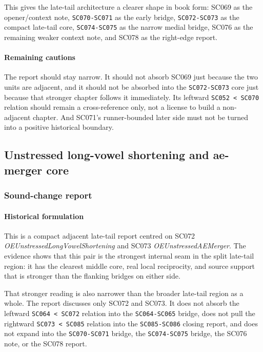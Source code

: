 \documentclass[
  british,
  a4paper,
]{article}
\begin{document}
This gives the late-tail architecture a clearer shape in book form:
SC069 as the opener/context note, \texttt{SC070-SC071} as the early
bridge, \texttt{SC072-SC073} as the compact late-tail core,
\texttt{SC074-SC075} as the narrow medial bridge, SC076 as the remaining
weaker context note, and SC078 as the right-edge report.

\paragraph{Remaining cautions}\label{remaining-cautions-44}

The report should stay narrow. It should not absorb SC069 just because
the two units are adjacent, and it should not be absorbed into the
\texttt{SC072-SC073} core just because that stronger chapter follows it
immediately. Its leftward \texttt{SC052\ \textless{}\ SC070} relation
should remain a cross-reference only, not a license to build a
non-adjacent chapter. And SC071's runner-bounded later side must not be
turned into a positive historical boundary.

\subsection{Unstressed long-vowel shortening and ae-merger
core}\label{unstressed-long-vowel-shortening-and-ae-merger-core}

\subsubsection{Sound-change report}\label{sound-change-report-45}

\paragraph{Historical formulation}\label{historical-formulation-45}

This is a compact adjacent late-tail report centred on SC072
\emph{OEUnstressedLongVowelShortening} and SC073
\emph{OEUnstressedAEMerger}. The evidence shows that this pair is the
strongest internal seam in the split late-tail region: it has the
clearest middle core, real local reciprocity, and source support that is
stronger than the flanking bridges on either side.

That stronger reading is also narrower than the broader late-tail region
as a whole. The report discusses only SC072 and SC073. It does not
absorb the leftward \texttt{SC064\ \textless{}\ SC072} relation into the
\texttt{SC064-SC065} bridge, does not pull the rightward
\texttt{SC073\ \textless{}\ SC085} relation into the
\texttt{SC085-SC086} closing report, and does not expand into the
\texttt{SC070-SC071} bridge, the \texttt{SC074-SC075} bridge, the SC076
note, or the SC078 report.
\end{document}
